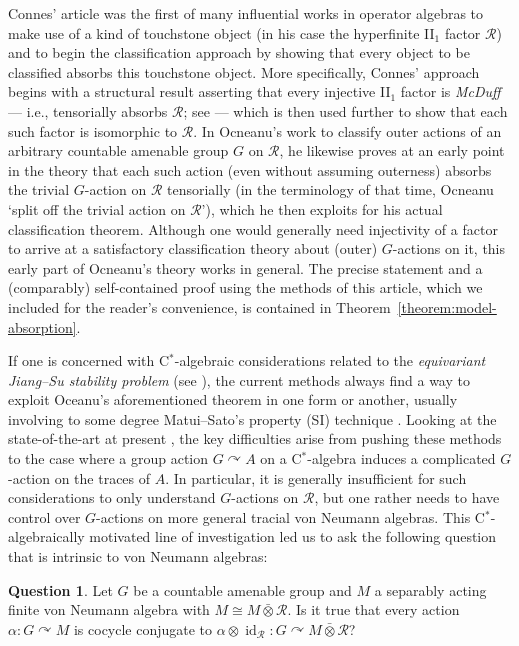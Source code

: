 \documentclass[11pt,a4paper]{article}
\theoremstyle{definition}
\newtheorem*{question}{Question}
\theoremstyle{remark}
\numberwithin{equation}{section}
\numberwithin{theorem}{section}
\newcommand{\cstar}{C$^*$}
\begin{document}
Connes' article \cite{Connes76} was the first of many influential works in operator algebras to make use of a kind of touchstone object (in his case the hyperfinite II$_1$ factor $\mathcal{R}$) and to begin the classification approach by showing that every object to be classified absorbs this touchstone object.
More specifically, Connes' approach begins with a structural result asserting that every injective II$_1$ factor is \emph{McDuff} --- i.e., tensorially absorbs $\mathcal R$; see \cite{McDuff70} --- which is then used further to show that each such factor is isomorphic to $\mathcal R$.
In Ocneanu's work to classify outer actions of an arbitrary countable amenable group $G$ on $\mathcal{R}$, he likewise proves at an early point in the theory that each such action (even without assuming outerness) absorbs the trivial $G$-action on $\mathcal R$ tensorially (in the terminology of that time, Ocneanu `split off the trivial action on $\mathcal R$'), which he then exploits for his actual classification theorem.
Although one would generally need injectivity of a factor to arrive at a satisfactory classification theory about (outer) $G$-actions on it, this early part of Ocneanu's theory works in general.
The precise statement and a (comparably) self-contained proof using the methods of this article, which we included for the reader's convenience, is contained in Theorem~\ref{theorem:model-absorption}.

If one is concerned with \cstar-algebraic considerations related to the \emph{equivariant Jiang--Su stability problem} (see \cite[Conjecture A]{Szabo21si}), the current methods always find a way to exploit Oceanu's aforementioned theorem in one form or another, usually involving to some degree Matui--Sato's property (SI) technique \cite{MatuiSato12acta, MatuiSato12, MatuiSato14, Sato19}.
Looking at the state-of-the-art at present \cite{GardellaHirshbergVaccaro, Wouters21}, the key difficulties arise from pushing these methods to the case where a group action $G\curvearrowright A$ on a \cstar-algebra induces a complicated $G$-action on the traces of $A$.
In particular, it is generally insufficient for such considerations to only understand $G$-actions on $\mathcal{R}$, but one rather needs to have control over $G$-actions on more general tracial von Neumann algebras.
This \cstar-algebraically motivated line of investigation led us to ask the following question that is intrinsic to von Neumann algebras:

\begin{question}
Let $G$ be a countable amenable group and $M$ a separably acting finite von Neumann algebra with $M\cong M\bar{\otimes}\mathcal R$.
Is it true that every action $\alpha: G\curvearrowright M$ is cocycle conjugate to $\alpha\otimes\operatorname{id}_{\mathcal R}: G\curvearrowright M\bar{\otimes}\mathcal R$?
\end{question}
\end{document}
